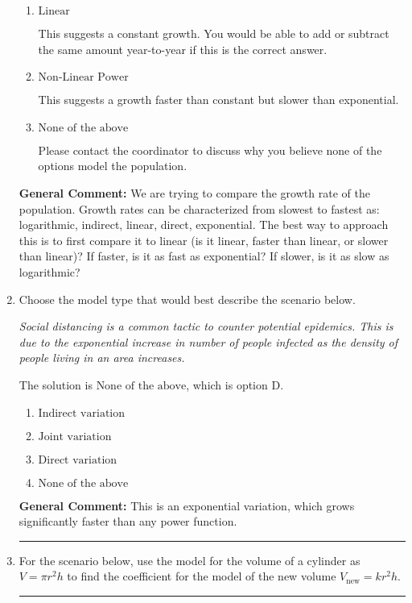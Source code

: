 \documentclass{extbook}[14pt]
\newcommand{\litem}[1]{\item #1

\rule{\textwidth}{0.4pt}}
\begin{document}
\begin{enumerate}
{\begin{enumerate}[label=\Alph*.]
This suggests the slowest of growths that we know.
\item \( \text{Linear} \)

This suggests a constant growth. You would be able to add or subtract the same amount year-to-year if this is the correct answer.
\item \( \text{Non-Linear Power} \)

This suggests a growth faster than constant but slower than exponential.
\item \( \text{None of the above} \)

Please contact the coordinator to discuss why you believe none of the options model the population.
\end{enumerate}

\textbf{General Comment:} We are trying to compare the growth rate of the population. Growth rates can be characterized from slowest to fastest as: logarithmic, indirect, linear, direct, exponential. The best way to approach this is to first compare it to linear (is it linear, faster than linear, or slower than linear)? If faster, is it as fast as exponential? If slower, is it as slow as logarithmic?
}
\litem{
Choose the model type that would best describe the scenario below.

\begin{center}
    \textit{ Social distancing is a common tactic to counter potential epidemics. This is due to the exponential increase in number of people infected as the density of people living in an area increases. }
\end{center}
The solution is \( \text{None of the above} \), which is option D.\begin{enumerate}[label=\Alph*.]
\item \( \text{Indirect variation} \)


\item \( \text{Joint variation} \)


\item \( \text{Direct variation} \)


\item \( \text{None of the above} \)


\end{enumerate}

\textbf{General Comment:} This is an exponential variation, which grows significantly faster than any power function.
}
\litem{
For the scenario below, use the model for the volume of a cylinder as $V = \pi r^2 h$ to find the coefficient for the model of the new volume $V_{\text{new}} = k r^2 h$.

}
\end{enumerate}
\end{document}
